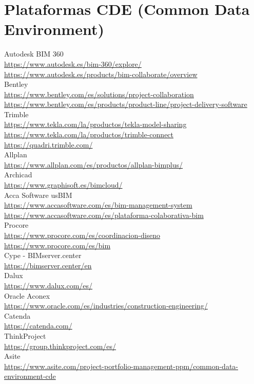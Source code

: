 \documentclass[spanish,12pt,a4paper,final,oneside]{book}
\begin{document}
\section{Plataformas CDE (Common Data Environment)}
Autodesk BIM 360 \\ \url{https://www.autodesk.es/bim-360/explore/} \\ \url{https://www.autodesk.es/products/bim-collaborate/overview}
\\ Bentley \\ \url{https://www.bentley.com/es/solutions/project-collaboration} \\ \url{https://www.bentley.com/es/products/product-line/project-delivery-software}
\\ Trimble \\ \url{https://www.tekla.com/la/productos/tekla-model-sharing} \\ \url{https://www.tekla.com/la/productos/trimble-connect} \\ \url{https://quadri.trimble.com/}
\\ Allplan \\ \url{https://www.allplan.com/es/productos/allplan-bimplus/}
\\ Archicad \\ \url{https://www.graphisoft.es/bimcloud/}
\\ Acca Software usBIM \\ \url{https://www.accasoftware.com/es/bim-management-system} \\ \url{https://www.accasoftware.com/es/plataforma-colaborativa-bim}
\\ Procore \\ \url{https://www.procore.com/es/coordinacion-diseno} \\ \url{https://www.procore.com/es/bim}
\\ Cype - BIMserver.center \\ \url{https://bimserver.center/en}
\\ Dalux \\ \url{https://www.dalux.com/es/}
\\ Oracle Aconex \\ \url{https://www.oracle.com/es/industries/construction-engineering/}
\\ Catenda \\ \url{https://catenda.com/}
\\ ThinkProject \\ \url{https://group.thinkproject.com/es/}
\\ Asite \\ \url{https://www.asite.com/project-portfolio-management-ppm/common-data-environment-cde}
\end{document}
